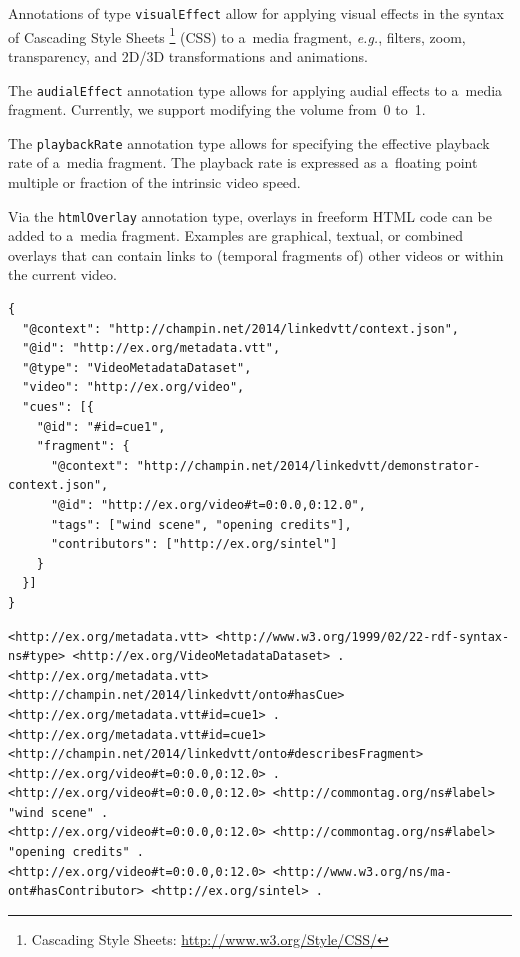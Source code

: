 \documentclass[runningheads,a4paper]{llncs}
\newcommand{\inlinelistingsize}{\fontsize{8pt}{11pt}}
\let\oldurl\url
\renewcommand{\url}[1]{\inlinelistingsize\oldurl{#1}}
\def\JSONLD{\mbox{JSON-LD}}
\def\JSONLD{\mbox{JSON-LD}}
\begin{document}
\begin{description}[leftmargin=*]
  \item[Visual Effect] Annotations of
  type \texttt{visualEffect} allow for applying visual effects
  in the syntax of Cascading Style Sheets%
  \footnote{Cascading Style Sheets:
  \url{http://www.w3.org/Style/CSS/}} (CSS)
  to a~media fragment, \emph{e.g.},
  filters, zoom, transparency,
  and 2D/3D transformations and animations.

  \item[Audial Effect] The \texttt{audialEffect} annotation type
  allows for applying audial effects to a~media fragment.
  Currently, we support modifying the volume
  from~0 to~1.

  \item[Playback Rate] The \texttt{playbackRate}
  annotation type allows for specifying the effective
  playback rate of a~media fragment.
  The playback rate is expressed as a~floating point
  multiple or fraction of the intrinsic video speed.

  \item[HTML Overlay] Via the \texttt{htmlOverlay}
  annotation type, overlays in
  freeform HTML code can be added to a~media fragment.
  Examples are graphical, textual, or combined overlays
  that can contain links to (temporal fragments of)
  other videos or within the current video.
\end{description}

\begin{lstlisting}[caption={Generated \JSONLD\ file based on the WebVTT file 
    shown in \autoref{listing:webvtt}~(flat interpretation)},
  label=listing:jsonld, float=t!]
{
  "@context": "http://champin.net/2014/linkedvtt/context.json",
  "@id": "http://ex.org/metadata.vtt", 
  "@type": "VideoMetadataDataset",
  "video": "http://ex.org/video", 
  "cues": [{
    "@id": "#id=cue1",
    "fragment": {
      "@context": "http://champin.net/2014/linkedvtt/demonstrator-context.json", 
      "@id": "http://ex.org/video#t=0:0.0,0:12.0", 
      "tags": ["wind scene", "opening credits"],
      "contributors": ["http://ex.org/sintel"]
    }
  }]
}
\end{lstlisting}

\begin{lstlisting}[caption={RDF triples based on the \JSONLD\ code from \autoref{listing:jsonld}},
  label=listing:rdftriples, float=t!]
<http://ex.org/metadata.vtt> <http://www.w3.org/1999/02/22-rdf-syntax-ns#type> <http://ex.org/VideoMetadataDataset> .
<http://ex.org/metadata.vtt> <http://champin.net/2014/linkedvtt/onto#hasCue> <http://ex.org/metadata.vtt#id=cue1> .
<http://ex.org/metadata.vtt#id=cue1> <http://champin.net/2014/linkedvtt/onto#describesFragment> <http://ex.org/video#t=0:0.0,0:12.0> .
<http://ex.org/video#t=0:0.0,0:12.0> <http://commontag.org/ns#label> "wind scene" .
<http://ex.org/video#t=0:0.0,0:12.0> <http://commontag.org/ns#label> "opening credits" .
<http://ex.org/video#t=0:0.0,0:12.0> <http://www.w3.org/ns/ma-ont#hasContributor> <http://ex.org/sintel> .
\end{lstlisting}
  
\end{document}
